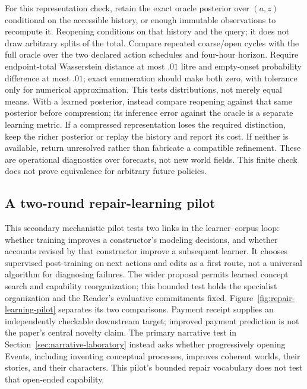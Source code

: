 \documentclass[10pt]{article}
\begin{document}
For this representation check, retain the exact oracle posterior over
$(a,z)$ conditional on the accessible history, or enough immutable
observations to recompute it. Reopening conditions on
that history and the query; it does not draw arbitrary splits of the total.
Compare repeated coarse/open cycles with the full oracle over the two declared
action schedules and four-hour horizon. Require endpoint-total Wasserstein
distance at most $.01$ litre and empty-onset probability difference at most
$.01$; exact enumeration should make both zero, with tolerance only for
numerical approximation. This tests distributions, not merely equal means.
With a learned posterior, instead compare reopening against that same
posterior before compression; its inference error against the oracle is a
separate learning metric.
If a compressed representation loses the required distinction, keep the
richer posterior or replay the history and report its cost. If neither is
available, return unresolved rather than fabricate a compatible refinement.
These are operational diagnostics over forecasts, not new world fields.
This finite check does not prove equivalence for arbitrary future policies.

\subsection{A two-round repair-learning pilot}
\label{sec:repair-pilot}

This secondary mechanistic pilot tests two links in the learner--corpus loop: whether training
improves a constructor's modeling decisions, and whether accounts revised by
that constructor improve a subsequent learner. It chooses supervised
post-training on next actions and edits as a first route, not a universal
algorithm for diagnosing failures. The wider proposal permits learned
concept search and capability reorganization; this bounded test holds the
specialist organization and the Reader's evaluative commitments fixed.
Figure~\ref{fig:repair-learning-pilot} separates its two comparisons. Payment
receipt supplies an independently checkable downstream target; improved
payment prediction is not the paper's central novelty claim. The primary
narrative test in Section~\ref{sec:narrative-laboratory} instead asks whether
progressively opening Events, including inventing conceptual processes,
improves coherent worlds, their stories, and their characters. This pilot's bounded
repair vocabulary does not test that open-ended capability.
\end{document}
